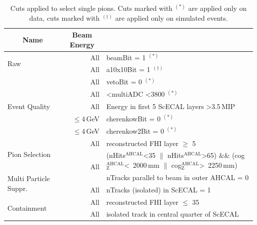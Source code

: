 \documentclass[twoside,a4paper,12pt]{article}
\begin{document}
\begin{appendix}
\begin{table}[htbp]
\begin{center}
\caption{Cuts applied to select single pions. Cuts marked with $^{(\ast)}$ are applied only on data, cuts marked with $^{(\dagger)}$ are applied only on simulated events.}
\label{table:pionselection}
\begin{tabular}{l|r|>{\centering\arraybackslash}p{8.5cm}}
    \multicolumn{1}{c|}{Name} & \multicolumn{1}{c|}{Beam Energy} & \multicolumn{1}{c}{Cut} \\\hline
	\multirow{2}{*}{Raw}& All & beamBit = 1 $^{(\ast)}$\\
	& All & a10x10Bit = 1 $^{(\dagger)}$\\\hline
	\multirow{5}{*}{Event Quality}& All & vetoBit = 0 $^{(\ast)}$\\
	& All & 2000 \textless multiADC \textless 3800 $^{(\ast)}$\\
	& All & Energy in first 5 ScECAL layers \textgreater 3.5\,MIP \\
	& $\leq$4\,GeV & cherenkowBit = 0 $^{(\ast)}$\\
	& $\leq$4\,GeV & cherenkow2Bit = 0 $^{(\ast)}$\\\hline
	\multirow{2}{*}{Pion Selection} & All & reconstructed FHI layer $\geq$ 5\\	
	& \multirow{2}{*}{All} & (nHits$^\text{AHCAL}$\textless35 $\|$ nHits$^\text{AHCAL}$\textgreater65) \&\&
(cog$_\text{Z}^\text{AHCAL}$\textless\ 2000\,mm $\|$ cog$_\text{Z}^\text{AHCAL}$\textgreater\ 2250\,mm) \\\hline
	\multirow{2}{*}{Multi Particle Suppr.} & All & nTracks parallel to beam in outer AHCAL = 0\\
	& All & nTracks (isolated) in ScECAL = 1\\\hline
	\multirow{2}{*}{Containment} & All & reconstructed FHI layer $\leq$ 35\\
	& All & isolated track in central quarter of ScECAL\\
	
\end{tabular}
\end{center}
\end{table}


\end{appendix}
\end{document}
